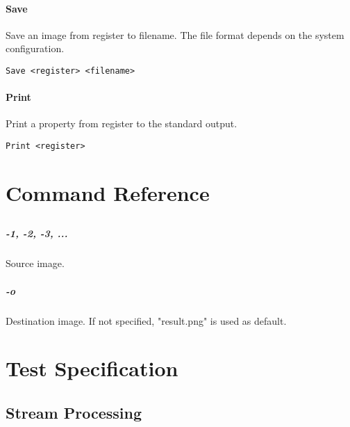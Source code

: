 \documentclass{jsbook}
\begin{document}
\begin{verbatim}
\end{verbatim}

\subsubsection{Save}

Save an image from register to filename.
The file format depends on the system configuration.

\begin{verbatim}
Save <register> <filename>
\end{verbatim}

\subsubsection{Print}

Print a property from register to the standard output.

\begin{verbatim}
Print <register>
\end{verbatim}


\chapter{Command Reference}

\section{}

\paragraph{-1, -2, -3, ...}
Source image.

\paragraph{-o}
Destination image.
If not specified, "result.png" is used as default.


\chapter{Test Specification}

\section{Stream Processing}
\end{document}
